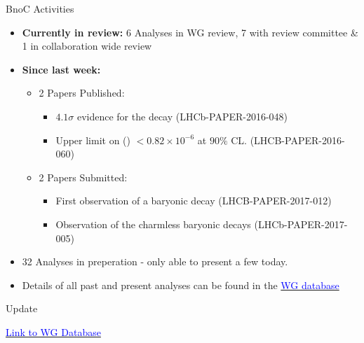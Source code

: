 \documentclass{beamer}
\begin{document}
\begin{frame}{BnoC Activities}
  \begin{itemize}
  \item \textbf{Currently in review:}
    6 Analyses in WG review, 7 with review committee \& 1 in collaboration wide review
  \item \textbf{Since last \lhcb week:}
    \begin{itemize}
    \item 2 Papers Published:
      \begin{itemize}
      \item $4.1\sigma$ evidence for the decay \decay{\Bp}{\proton \Lbar} (LHCb-PAPER-2016-048)\\
      \item Upper limit on \BF(\decay{\Bs}{\phiz \etapr}) $< 0.82 \times 10^{-6}$ at $90\%$ CL. (LHCB-PAPER-2016-060)
      \end{itemize}
    \item 2 Papers Submitted:
      \begin{itemize}
      \item First observation of a baryonic \Bs decay (LHCB-PAPER-2017-012)
      \item Observation of the charmless baryonic decays  (LHCb-PAPER-2017-005)
      \end{itemize}
    \end{itemize}
  \item 32 Analyses in preperation - only able to present a few today.
  \item Details of all past and present analyses can be found in the \href{https://lhcb-wg.web.cern.ch/lhcb-WG/bnoc/list.py}{\textcolor{blue}{WG database}}
  \end{itemize}
\end{frame}

\begin{frame}
  \begin{center}
    \begin{block}{}
      \centering \Huge {} Update
    \end{block}
    \href{https://lhcb-wg.web.cern.ch/lhcb-WG/bnoc/listentry.py?name=2011\%2B12+B+-\%3E+p+pbar+BFs\&cat=analysis}{\textcolor{blue}{Link to WG Database}}
  \end{center}
\end{frame}
\end{document}
